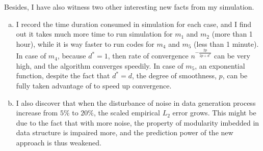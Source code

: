 Besides, I have also witness two other interesting new facts from my simulation. 

\begin{enumerate}[(a)]
\item I record the time duration consumed in simulation for each case, and I find out it takes much more time to run simulation for $m_1$ and $m_2$ (more than 1 hour), while it is way faster to run codes for $m_4$ and $m_5$ (less than 1 minute). In case of $m_4$, because $d^*=1$, then rate of convergence $n^{-\frac{2p}{2p+d^*}}$ can be very high, and the algorithm converges speedily. In case of $m_5$, an exponential function, despite the fact that $d^*=d$, the degree of smoothness, $p$, can be fully taken advantage of to speed up convergence. 
\item I also discover that when the disturbance of noise in data generation process increase from $5\%$ to $20\%$, the scaled empirical $L_2$ error grows. This might be due to the fact that with more noise, the property of modularity imbedded in data structure is impaired more, and the prediction power of the new approach is thus weakened.
\end{enumerate}